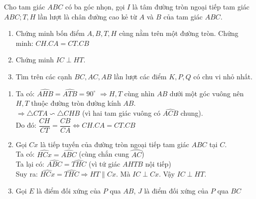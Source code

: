 \begin{ex}%
Cho tam giác $ABC$ có ba góc nhọn, gọi $I$ là tâm đường tròn ngoại tiếp tam giác $ABC;T,H$ lần lượt là chân đường cao kẻ từ $A$ và $B$ của tam giác $ABC$.
\begin{enumerate}
\item Chứng minh bốn điểm $A,B,T,H$ cùng nằm trên một đường tròn. Chứng minh: $CH.CA=CT.CB$
\item Chứng minh $IC\perp HT.$
\item Tìm trên các cạnh $BC,AC,AB$ lần lượt các điểm $K,P,Q$ có chu vi nhỏ nhất.
\end{enumerate}
\loigiai
{\begin{center}
\end{center}
\begin{enumerate}
\item Ta có: $\widehat{AHB}=\widehat{ATB}={90}^{\circ}$
$\Rightarrow H,T$ cùng nhìn $AB$ dưới một góc vuông nên $H, T$ thuộc đường tròn đường kính $AB$.\\
$\Rightarrow\triangle CTA\backsim \triangle CHB$ (vì hai tam giác vuông có $\widehat{ACB}$ chung).\\
Do đó: $\dfrac{CH}{CT}=\dfrac{CB}{CA}\Leftrightarrow CH.CA=CT.CB$
\item Gọi $Cx$ là tiếp tuyến của đường tròn ngoại tiếp tam giác $ABC$ tại $C$.\\
Ta có: $\widehat{HCx}=\widehat{ABC}$ (cùng chắn cung $\wideparen{AC}$)\\
Ta lại có: $\widehat{ABC}=\widehat{THC}$ (vì tứ giác $AHTB$ nội tiếp)\\
Suy ra: $\widehat{HCx}=\widehat{THC}\Rightarrow HT\parallel Cx.$
Mà $IC\perp Cx$. Vậy $IC \perp HT.$
\item Gọi $E$ là điểm đối xứng của $P$ qua $AB$, $J$ là điểm đối xứng của $P$ qua $BC$

\end{enumerate}}
\end{ex}
